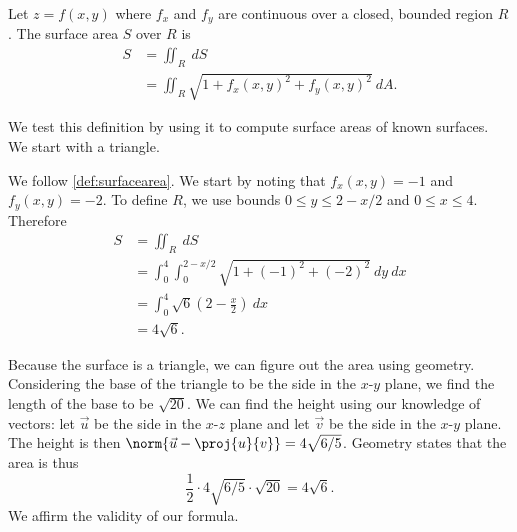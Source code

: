 {Let $z=f(x,y)$ where $f_x$ and $f_y$ are continuous over a closed, bounded region $R$. The surface area $S$ over $R$ is 
\begin{align*}
S &= \iint_R \ dS\\
&=\iint_R \sqrt{1+f_x(x,y)^2+f_y(x,y)^2}\ dA.
\end{align*}}


We test this definition by using it to compute surface areas of known surfaces. We start with a triangle.

{We follow \autoref{def:surfacearea}. We start by noting that $f_x(x,y) = -1$ and $f_y(x,y) = -2$. To define $R$, we use bounds $0\leq y\leq 2-x/2$ and $0\leq x\leq 4$. Therefore
\begin{align*}
S &= \iint_R\ dS \\
  &= \int_0^4\int_0^{2-x/2} \sqrt{1+(-1)^2+(-2)^2}\ dy\ dx\\
	&= \int_0^4 \sqrt{6}\left(2-\frac x2\right)\ dx\\
	&= 4\sqrt{6}.
\end{align*}

Because the surface is a triangle, we can figure out the area using geometry. Considering the base of the triangle to be the side in the $x$-$y$ plane, we find the length of the base to be $\sqrt{20}$. We can find the height using our knowledge of vectors: let $\vec u$ be the side in the $x$-$z$ plane  and let $\vec v$ be the side in the $x$-$y$ plane. The height is then $\norm {\vec u - \proj{u}{v}} = 4\sqrt{6/5}$. Geometry states that the area is thus
$$\frac 12\cdot4\sqrt{6/5}\cdot\sqrt{20} = 4\sqrt{6}.$$
We affirm the validity of our formula.}

